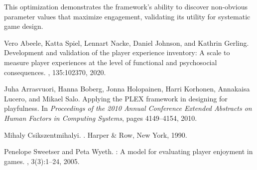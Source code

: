 \documentclass{article}
\begin{document}
This optimization demonstrates the framework's ability to discover non-obvious parameter values that maximize engagement, validating its utility for systematic game design.


\begin{thebibliography}{1}

Vero Abeele, Katta Spiel, Lennart Nacke, Daniel Johnson, and Kathrin Gerling.
\newblock Development and validation of the player experience inventory: A scale to measure player experiences at the level of functional and psychosocial consequences.
, 135:102370, 2020.

Juha Arrasvuori, Hanna Boberg, Jonna Holopainen, Harri Korhonen, Annakaisa Lucero, and Mikael Salo.
\newblock Applying the {PLEX} framework in designing for playfulness.
\newblock In {\em Proceedings of the 2010 Annual Conference Extended Abstracts on Human Factors in Computing Systems}, pages 4149--4154, 2010.

Mihaly Csikszentmihalyi.
.
\newblock Harper \& Row, New York, 1990.

Penelope Sweetser and Peta Wyeth.
: A model for evaluating player enjoyment in games.
, 3(3):1--24, 2005.

\end{thebibliography}
\end{document}
